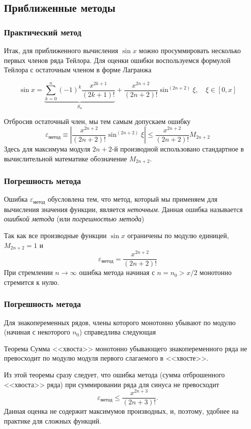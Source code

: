 \documentclass[aspectratio=169,unicode]{beamer}
\begin{document}
\subsection{Приближенные методы}
\begin{frame}
\frametitle{Практический метод}
	Итак, для приближенного вычисления $\sin x$ можно просуммировать
	несколько первых членов ряда Тейлора. Для оценки ошибки воспользуемся
	формулой Тейлора с остаточным членом в форме Лагранжа

	\[
	\sin x = \underbrace{\sum_{k=0}^{n} (-1)^k \frac{x^{2k+1}}{(2k+1)!}}_{S_n} +
	\frac{x^{2n+2}}{(2n+2)!}\sin^{(2n+2)} \xi,
	\quad \xi \in [0, x]
	\]

	\pause

	Отбросив остаточный член, мы тем самым допускаем ошибку
	\[
	\varepsilon_{\text{метод}}\equiv
	\left|\frac{x^{2n+2}}{(2n+2)!}\sin^{(2n+2)} \xi \right| \leqslant
	\frac{x^{2n+2}}{(2n+2)!}M_{2n+2}
	\]
	Здесь для максимума модуля $2n+2$-й производной использовано стандартное в
	вычислительной математике обозначение $M_{2n+2}$.
\end{frame}

\begin{frame}
\frametitle{Погрешность метода}
	Ошибка $\varepsilon_{\text{метод}}$ обусловлена тем, что метод, который мы
	применяем для вычисления значения функции, является \emph{неточным}.
	Данная ошибка называется \emph{ошибкой метода} (или \emph{погрешностью метода})

	\pause

	Так как все производные функции $\sin x$ ограничены по модулю единицей, $M_{2n+2} = 1$ и
	\[
	\varepsilon_{\text{метод}} = \frac{x^{2n+2}}{(2n+2)!}
	\]
	При стремлении $n \rightarrow \infty$ ошибка метода начиная с $n = n_0 >
	x/2$ монотонно стремится к нулю.
\end{frame}

\begin{frame}
\frametitle{Погрешность метода}
	Для знакопеременных рядов, члены которого монотонно убывают по модулю
	(начиная с некоторого $n_0$) справедлива следующая
	\begin{block}{Теорема}
	Сумма <<хвоста>> монотонно убывающего знакопеременного ряда не
	превосходит по модулю модуля первого слагаемого в <<хвосте>>.
	\end{block}

	Из этой теоремы сразу следует, что ошибка метода (сумма отброшенного
	<<хвоста>> ряда) при суммировании ряда для
	синуса не превосходит
	\[
		\varepsilon_\text{метод} \leq \frac{x^{2n+3}}{(2n+3)!}.
	\]
	Данная оценка не содержит максимумов производных, и, поэтому, удобнее на
	практике для сложных функций.
\end{frame}
\end{document}
